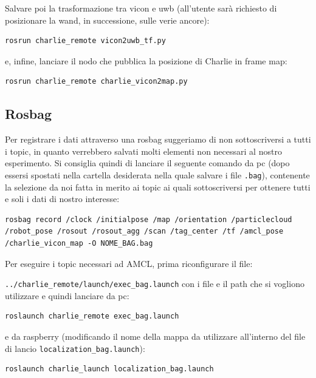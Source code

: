 Salvare poi la trasformazione tra vicon e uwb (all'utente sarà richiesto di posizionare la wand, in successione, sulle verie ancore):
\begin{lstlisting}[style=bashPC]
	rosrun charlie_remote vicon2uwb_tf.py
\end{lstlisting}

e, infine, lanciare il nodo che pubblica la posizione di Charlie in frame map:
\begin{lstlisting}[style=bashPC]
	rosrun charlie_remote charlie_vicon2map.py
\end{lstlisting}


\subsection{Rosbag}
Per registrare i dati attraverso una rosbag suggeriamo di non sottoscriversi a tutti i topic, in quanto verrebbero salvati molti elementi non necessari 
al nostro esperimento. Si consiglia quindi di lanciare il seguente comando da pc (dopo essersi spostati nella cartella desiderata nella quale salvare i 
file \verb|.bag|), contenente la selezione da noi fatta in merito ai topic ai quali sottoscriversi per ottenere tutti e soli i dati di nostro interesse:
\begin{lstlisting}[style=bashPC]
	rosbag record /clock /initialpose /map /orientation /particlecloud /robot_pose /rosout /rosout_agg /scan /tag_center /tf /amcl_pose /charlie_vicon_map -O NOME_BAG.bag
\end{lstlisting}

Per eseguire i topic necessari ad AMCL, prima riconfigurare il file:

\verb|../charlie_remote/launch/exec_bag.launch| con i file e il path che si vogliono utilizzare e quindi lanciare da pc:
\begin{lstlisting}[style=bashPC]
	roslaunch charlie_remote exec_bag.launch
\end{lstlisting}
e da raspberry (modificando il nome della mappa da utilizzare all'interno del file di lancio \verb|localization_bag.launch|):
\begin{lstlisting}[style=bash]
	roslaunch charlie_launch localization_bag.launch
\end{lstlisting}



\newpage



